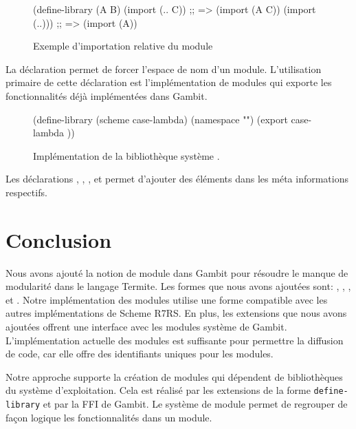 \begin{figure}[ht]
  \centering
  \fontsize{12}{10}
  \begin{mplisting}{0.8}
(define-library (A B)
  (import (.. C))  ;; => (import (A C))
  (import (..))) ;; => (import (A))
\end{mplisting}
  \caption{Exemple d'importation relative du module}
  \label{fig:relative-import}
\end{figure}

La déclaration  permet de forcer l'espace de nom d'un module.
L'utilisation primaire de cette déclaration est l'implémentation de modules qui
exporte les fonctionnalités déjà implémentées dans Gambit. \\[1ex]

\begin{figure}[ht]
  \fontsize{12}{10}
  \begin{mplisting}{0.8}
(define-library (scheme case-lambda)
  (namespace "")
  (export
case-lambda
))
\end{mplisting}
  \caption{Implémentation de la bibliothèque système .}
  \label{fig:module->scheme/case-lambda}
\end{figure}

Les déclarations , , ,
 et  permet d'ajouter des éléments dans les
méta informations respectifs.

\section{Conclusion}

Nous avons ajouté la notion de module dans Gambit pour résoudre le manque de
modularité dans le langage Termite.  Les formes que nous avons ajoutées sont:
, , ,
 et .  Notre implémentation des modules
utilise une forme compatible avec les autres implémentations de Scheme R7RS. En
plus, les extensions que nous avons ajoutées offrent une interface avec les
modules système de Gambit. L'implémentation actuelle des modules est suffisante
pour permettre la diffusion de code, car elle offre des identifiants uniques
pour les modules.

Notre approche supporte la création de modules qui dépendent de bibliothèques
du système d'exploitation.  Cela est réalisé par les extensions de la forme
\texttt{define-library} et par la FFI de Gambit. Le système de module permet
de regrouper de façon logique les fonctionnalités dans un module.
